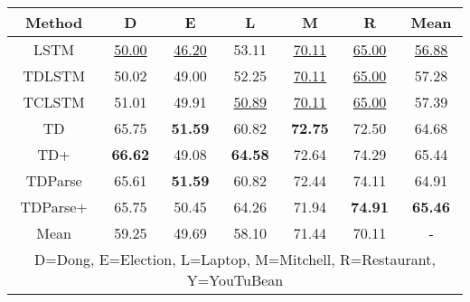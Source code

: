 \begin{tabular}{|c|c|c|c|c|c|c|}
\hline
Method  &   D &  E &  L &  M &  R  &   Mean \\
\hline
LSTM &  \underline{50.00} &     \underline{46.20} &   53.11 &     \underline{70.11} &       \underline{65.00} &  \underline{56.88} \\
\hline  
TDLSTM &  50.02 &     49.00 &   52.25 &     \underline{70.11} &       \underline{65.00} &  57.28 \\
\hline  
TCLSTM &  51.01 &     49.91 &   \underline{50.89} &     \underline{70.11} &       \underline{65.00} &  57.39 \\
\hline   
TD &  65.75 &     \textbf{51.59} &   60.82 &     \textbf{72.75} &       72.50 &  64.68 \\
\hline    
TD+ &  \textbf{66.62} &     49.08 &   \textbf{64.58} &     72.64 &       74.29 &  65.44 \\
\hline    
TDParse &  65.61 &     \textbf{51.59} &   60.82 &     72.44 &       74.11 &  64.91 \\
\hline    
TDParse+ &  65.75 &     50.45 &   64.26 &     71.94 &       \textbf{74.91} &  \textbf{65.46} \\
\hline
Mean &  59.25 &     49.69 &   58.10 &     71.44 &       70.11 &  - \\
\hline
\multicolumn{7}{|p{9.5cm}|}{\centering D=Dong, E=Election, L=Laptop, M=Mitchell, R=Restaurant, Y=YouTuBean}\\
\hline
\end{tabular}